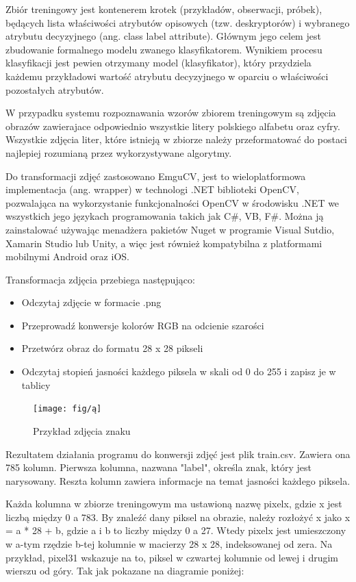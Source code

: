\documentclass[brudnopis]{xmgr}
\begin{document}
Zbiór treningowy jest kontenerem krotek (przykładów, obserwacji, próbek), będących lista właściwości atrybutów opisowych (tzw. deskryptorów) i wybranego atrybutu decyzyjnego (ang. class label attribute). Głównym jego celem jest zbudowanie formalnego modelu zwanego klasyfikatorem. Wynikiem procesu klasyfikacji jest pewien otrzymany model (klasyfikator), który przydziela każdemu przykładowi wartość atrybutu decyzyjnego w oparciu o właściwości pozostałych atrybutów.

W przypadku systemu rozpoznawania wzorów zbiorem treningowym są zdjęcia obrazów zawierajace odpowiednio wszystkie litery polskiego alfabetu oraz cyfry. Wszystkie zdjęcia liter, które istnieją w zbiorze należy przeformatować do postaci najlepiej rozumianą przez wykorzystywane algorytmy.

Do transformacji zdjęć zastosowano EmguCV, jest to wieloplatformowa implementacja (ang. wrapper) w technologi .NET biblioteki OpenCV, pozwalająca na wykorzystanie funkcjonalności OpenCV w środowisku .NET we wszystkich jego językach programowania takich jak C\#, VB, F\#. Można ją zainstalować używając menadżera pakietów Nuget w programie Visual Sutdio, Xamarin Studio lub Unity, a więc jest również kompatybilna z platformami mobilnymi Android oraz iOS.

Transformacja zdjęcia przebiega następująco:
\begin{itemize}
\item
Odczytaj zdjęcie w formacie .png
\item
Przeprowadź konwersje kolorów RGB na odcienie szarości
\item
Przetwórz obraz do formatu 28 x 28 pikseli
\item
Odczytaj stopień jasności każdego piksela w skali od 0 do 255 i zapisz je w tablicy
\end{itemize}

\begin{figure}[!tbh]
\centering
\texttt{[image: fig/ą]}
\caption{Przykład zdjęcia znaku}
\end{figure}
Rezultatem działania programu do konwersji zdjęć jest plik train.csv. Zawiera ona 785 kolumn. Pierwsza kolumna, nazwana "label", określa znak, który jest narysowany. Reszta kolumn zawiera informacje na temat jasności każdego piksela.

Każda kolumna w zbiorze treningowym ma ustawioną nazwę pixelx, gdzie x jest liczbą między 0 a 783. By znaleźć dany piksel na obrazie, należy rozłożyć x jako x = a * 28 + b, gdzie a i b to liczby między 0 a 27. Wtedy pixelx jest umieszczony w a-tym rzędzie b-tej kolumnie w macierzy 28 x 28, indeksowanej od zera. Na przykład, pixel31 wskazuje na to, piksel w czwartej kolumnie od lewej i drugim wierszu od góry. Tak jak pokazane na diagramie poniżej:
\end{document}
